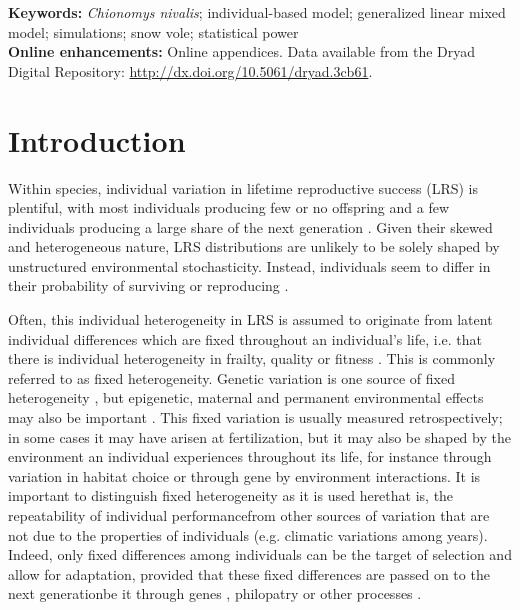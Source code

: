 \textbf{Keywords: } \textit{Chionomys nivalis}; individual-based model; generalized linear mixed model; simulations; snow vole; statistical power\\
\textbf{Online enhancements: }
Online appendices. Data available from the Dryad Digital Repository: \url{http://dx.doi.org/10.5061/dryad.3cb61}.

\section[Introduction]{Introduction}

Within species, individual variation in lifetime reproductive success (LRS) is plentiful, with most individuals producing few or no offspring and a few individuals producing a large share of the next generation \parencite{Clutton1988,Stearns1992}. Given their skewed and heterogeneous nature, LRS distributions are unlikely to be solely shaped by unstructured environmental stochasticity. Instead, individuals seem to differ in their probability of surviving or reproducing \parencite{Kendall2011}.

Often, this individual heterogeneity in LRS is assumed to originate from latent individual differences which are fixed throughout an individual's life, i.e. that there is individual heterogeneity in frailty, quality or fitness \parencite[e.g.][]{Vaupel1979,Morris1998, Cam2000}. This is commonly referred to as fixed heterogeneity. Genetic variation is one source of fixed heterogeneity \parencite[e.g.][]{Keller2002,Ellegren2008}, but epigenetic, maternal and permanent environmental effects may also be important \parencite{Wolf2009,Turner2009}. This fixed variation is usually measured retrospectively; in some cases it may have arisen at fertilization, but it may also be shaped by the environment an individual experiences throughout its life, for instance through variation in habitat choice or through gene by environment interactions. It is important to distinguish fixed heterogeneity as it is used here\textemdash that is, the repeatability of individual performance\textemdash from other sources of variation that are not due to the properties of individuals (e.g. climatic variations among years). Indeed, only fixed differences among individuals can be the target of selection and allow for adaptation, provided that these fixed differences are passed on to the next generation\textemdash be it through genes \parencite{Keller2002}, philopatry \parencite{Schauber2011} or other processes \parencite{Bonduriansky2012}. 

